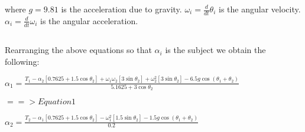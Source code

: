 	where\newline\newline
		$g = 9.81$ is the acceleration due to gravity.\newline
		$\omega _{i} = \frac{d}{dt} \theta _{i}$ is the angular velocity.\newline
		$\alpha _{i} = \frac{d}{dt} \omega _{i}$ is the angular acceleration.\newline
	\pagebreak	
	\subsection{}
	Rearranging the above equations so that $\alpha _{i}$ is the subject we obtain the following:\newline\newline
	
	\hspace{20mm} $ \alpha _{1} = \frac{T_{1} - \alpha _{2}[0.7625 + 1.5\cos \theta _{2}] + \omega _{1}\omega _{2}[3\sin \theta _{2}] + \omega^2 _{2}[3\sin \theta _{2}] - 6.5g\cos (\theta _{1} + \theta _{2})}{5.1625 + 3\cos \theta _{2}} $\newline 
	
	\hspace{30mm}$==> Equation 1$\newline\newline
	
	\hspace{20mm} $ \alpha _{2} = \frac{T_{2} - \alpha _{1}[0.7625 + 1.5\cos \theta _{2}] - \omega^2 _{1}[1.5\sin \theta _{2}] - 1.5g\cos (\theta _{1} + \theta _{2})}{0.2} $\newline 
	

